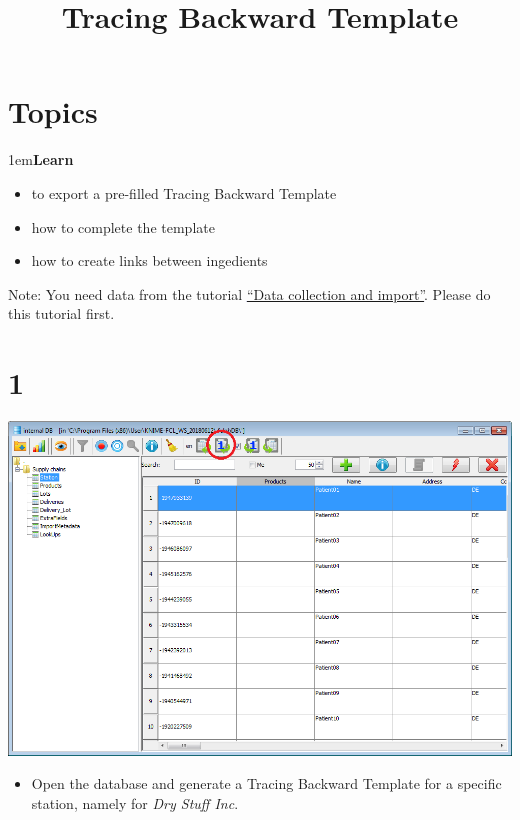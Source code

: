 \documentclass[10pt]{beamer}
\title{Tracing Backward Template}
\date{}
\begin{document}
\maketitle

\section{Topics}
\begin{frame}
\leftskip1em\textbf{Learn}
	\begin{itemize}
		\item to export a pre-filled Tracing Backward Template
		\item how to complete the template
		\item how to create links between ingedients
	\end{itemize}
\vspace*{\fill}
Note: You need data from the tutorial \textcolor{blue}{\underline{\href{https://foodrisklabs.bfr.bund.de/data-collection-and-import/}{``Data collection and import''}}}. Please do this tutorial first.
\end{frame}

\section{1}
\begin{frame}
	\begin{center}
			\includegraphics[height=0.6\textheight]{1.png}
	\end{center}
	\begin{itemize}
		\item Open the database and generate a Tracing Backward Template for a specific station, namely for \textit{Dry Stuff Inc}.
	\end{itemize}
\end{frame}
\end{document}
